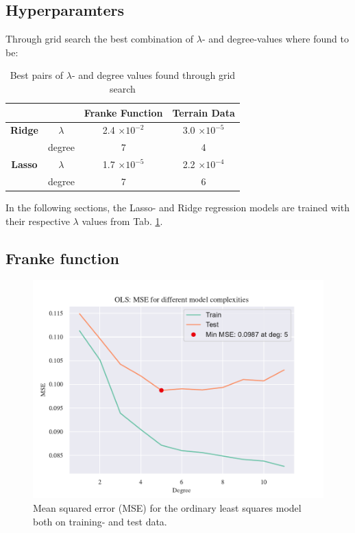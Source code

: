 \subsection{Hyperparamters}

Through grid search the best combination of $\lambda$- and degree-values where found to be: 

\begin{table}[h!]
    \centering
    \begin{tabular}{|c|c|c|c|}
        \hline
        & & \textbf{Franke Function} & \textbf{Terrain Data} \\ \hline
        \textbf{Ridge} & $\lambda$ & 2.4 $\times 10^{-2}$ & 3.0 $\times 10^{-5}$ \\ 
         & degree & 7 & 4 \\ \hline
        \textbf{Lasso} & $\lambda$ & 1.7 $\times 10^{-5}$ & 2.2 $\times 10^{-4}$ \\ 
         & degree & 7 & 6 \\ \hline
    \end{tabular}
    \caption{Best pairs of $\lambda$- and degree values found through grid search}
    \label{tab:grid}
\end{table}

In the following sections, the Lasso- and Ridge regression models are trained with their respective $\lambda$ values from Tab. \ref{tab:grid}. 

\subsection{Franke function}

\begin{figure}[h!]
    \centering
    \includegraphics[width=1\linewidth]{project_1_alt/figures/figures_in_report/OLS_MSE_Franke_Noise.pdf}
    \caption{Mean squared error (MSE) for the ordinary least squares model both on training- and test data.}
    \label{fig:mseols}
\end{figure}

